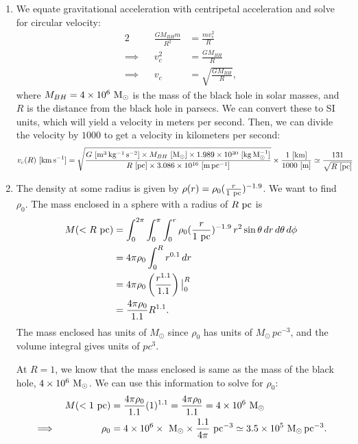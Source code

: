 \documentclass[11pt,letterpaper]{article}
\begin{document}
\begin{enumerate}[label=(\alph*)]
    \item We equate gravitational acceleration with centripetal acceleration and solve for circular velocity: 
        \begin{alignat*}{2}
            &&\frac{GM_{BH}m}{R^2} &= \frac{mv_c^2}{R} \\
            \implies&&v_c^2 &= \frac{GM_{BH}}{R} \\
            \implies&&v_c &= \sqrt{\frac{GM_{BH}}{R}},
        \end{alignat*}
        where $M_{BH} = 4\times 10^{6}~{\rm M_\odot}$ is the mass of the black hole in solar masses, and $R$ is the distance from the black hole in parsecs. We can convert these to SI units, which will yield a velocity in meters per second. Then, we can divide the velocity by $1000$ to get a velocity in kilometers per second:
        \begin{align*}
            v_c(R)~{\rm [km\,s^{-1}]} &= \sqrt{\frac{G~{\rm [m^3\,kg^{-1}\,s^{-2}]}\times M_{BH}~{\rm [M_\odot]}\times 1.989\times 10^{30}~{\rm [kg\,M_\odot^{-1}]}}{R~{\rm [pc]}\times 3.086\times 10^{16}~{\rm [m\,pc^{-1}]}}} \times \frac{1~{\rm [km]}}{1000~{\rm [m]}} \simeq \frac{131}{\sqrt{R~{\rm [pc]}}}
        \end{align*}

    \item The density at some radius is given by $\rho(r) = \rho_0(\frac{r}{1~{\rm pc}})^{-1.9}$. We want to find $\rho_0$. The mass enclosed in a sphere with a radius of $R~{\rm pc}$ is 
        \begin{align*}
            M(<R~{\rm pc}) &= \int_0^{2\pi}\int_0^{\pi}\int_0^{r}\rho_0 (\frac{r}{1~{\rm pc}})^{-1.9}\,r^2 \sin{\theta}\,dr\,d\theta\,d\phi \\
            &= 4\pi\rho_0 \int_0^R r^{0.1}\,dr \\
            &= 4\pi\rho_0 \left(\frac{r^{1.1}}{1.1}\right)\big|_0^R \\
            &= \frac{4\pi\rho_0}{1.1}R^{1.1}.
        \end{align*}
        The mass enclosed has units of $M_\odot$ since $\rho_0$ has units of $M_\odot\,pc^{-3}$, and the volume integral gives units of $pc^{3}$. 

        At $R=1$, we know that the mass enclosed is same as the mass of the black hole, $4\times 10^{6}~{\rm M_\odot}$. We can use this information to solve for $\rho_0$:
        \begin{alignat*}{2}
            &&M(<1~{\rm pc}) &= \frac{4\pi\rho_0}{1.1}(1)^{1.1} = \frac{4\pi\rho_0}{1.1} = 4\times 10^{6}~{\rm M_\odot} \\
            \implies&&\rho_0 &= 4\times 10^{6}\times~{\rm M_\odot} \times \frac{1.1}{4\pi}~{\rm pc^{-3}} \simeq 3.5\times 10^5~{\rm M_\odot\,pc^{-3}}.
        \end{alignat*}


\end{enumerate}
\end{document}
